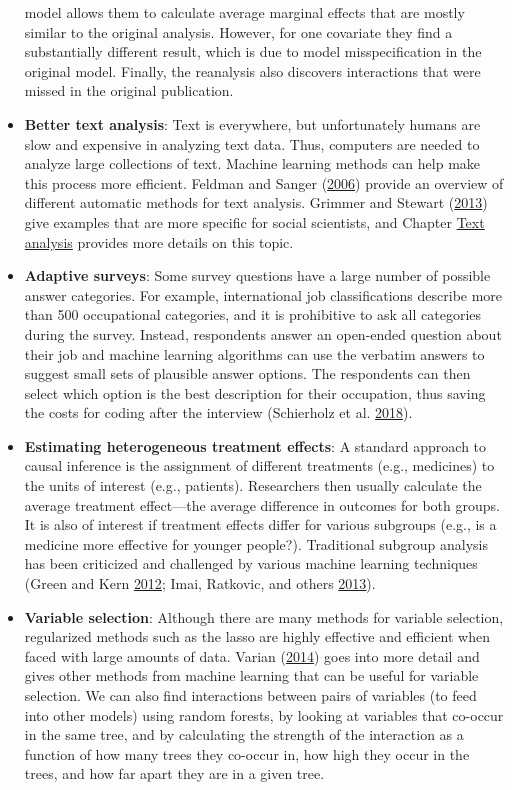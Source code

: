 \documentclass[]{krantz}
\begin{document}
\begin{itemize}
  model allows them to calculate average marginal effects that are
  mostly similar to the original analysis. However, for one covariate
  they find a substantially different result, which is due to model
  misspecification in the original model. Finally, the reanalysis also
  discovers interactions that were missed in the original publication.
\item
  \textbf{Better text analysis}: Text is everywhere, but unfortunately
  humans are slow and expensive in analyzing text data. Thus, computers
  are needed to analyze large collections of text. Machine learning
  methods can help make this process more efficient. Feldman and Sanger
  (\protect\hyperlink{ref-FeldmanSanger}{2006}) provide an overview of
  different automatic methods for text analysis. Grimmer and Stewart
  (\protect\hyperlink{ref-grimmer2013text}{2013}) give examples that are
  more specific for social scientists, and Chapter
  \protect\hyperlink{chap:text}{Text analysis} provides more details on
  this topic.
\item
  \textbf{Adaptive surveys}: Some survey questions have a large number
  of possible answer categories. For example, international job
  classifications describe more than 500 occupational categories, and it
  is prohibitive to ask all categories during the survey. Instead,
  respondents answer an open-ended question about their job and machine
  learning algorithms can use the verbatim answers to suggest small sets
  of plausible answer options. The respondents can then select which
  option is the best description for their occupation, thus saving the
  costs for coding after the interview (Schierholz et al.
  \protect\hyperlink{ref-Schierholz2018}{2018}).
\item
  \textbf{Estimating heterogeneous treatment effects}: A standard
  approach to causal inference is the assignment of different treatments
  (e.g., medicines) to the units of interest (e.g., patients).
  Researchers then usually calculate the average treatment effect---the
  average difference in outcomes for both groups. It is also of interest
  if treatment effects differ for various subgroups (e.g., is a medicine
  more effective for younger people?). Traditional subgroup analysis has
  been criticized and challenged by various machine learning techniques
  (Green and Kern \protect\hyperlink{ref-green2012modeling}{2012}; Imai,
  Ratkovic, and others
  \protect\hyperlink{ref-imai2013estimating}{2013}).
\item
  \textbf{Variable selection}: Although there are many methods for
  variable selection, regularized methods such as the lasso are highly
  effective and efficient when faced with large amounts of data. Varian
  (\protect\hyperlink{ref-Varian2014}{2014}) goes into more detail and
  gives other methods from machine learning that can be useful for
  variable selection. We can also find interactions between pairs of
  variables (to feed into other models) using random forests, by looking
  at variables that co-occur in the same tree, and by calculating the
  strength of the interaction as a function of how many trees they
  co-occur in, how high they occur in the trees, and how far apart they
  are in a given tree.
\end{itemize}
\end{document}
